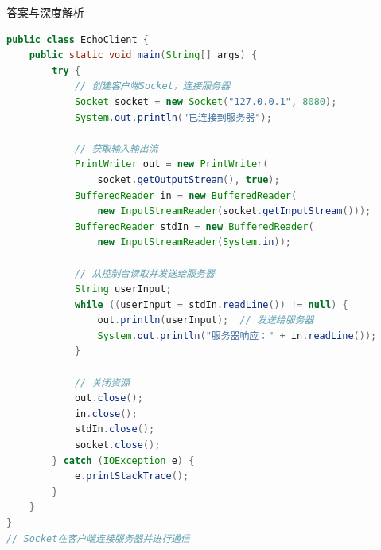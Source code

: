 \documentclass[12pt, a4paper]{ctexart}
\begin{document}
\begin{enumerate}[label=\textbf{\arabic*.}]
\begin{bluebox}{答案与深度解析}
\begin{itemize}[leftmargin=*, nosep, label={}]
\begin{itemize}[label={}, leftmargin=*, nosep]
\begin{lstlisting}[language=Java]
public class EchoClient {
    public static void main(String[] args) {
        try {
            // 创建客户端Socket，连接服务器
            Socket socket = new Socket("127.0.0.1", 8080);
            System.out.println("已连接到服务器");

            // 获取输入输出流
            PrintWriter out = new PrintWriter(
                socket.getOutputStream(), true);
            BufferedReader in = new BufferedReader(
                new InputStreamReader(socket.getInputStream()));
            BufferedReader stdIn = new BufferedReader(
                new InputStreamReader(System.in));

            // 从控制台读取并发送给服务器
            String userInput;
            while ((userInput = stdIn.readLine()) != null) {
                out.println(userInput);  // 发送给服务器
                System.out.println("服务器响应：" + in.readLine());
            }

            // 关闭资源
            out.close();
            in.close();
            stdIn.close();
            socket.close();
        } catch (IOException e) {
            e.printStackTrace();
        }
    }
}
// Socket在客户端连接服务器并进行通信
				      \end{lstlisting}
			            \end{itemize}


\end{itemize}
\end{bluebox}
\end{enumerate}
\end{document}
